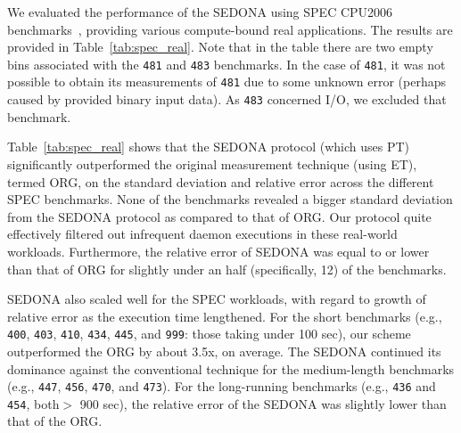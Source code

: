 \documentclass[letter]{ieice}
\begin{document}
We evaluated the performance of the SEDONA using SPEC CPU2006 
benchmarks~\cite{specCpu2006}, providing various compute-bound real applications. 
The results are provided in Table~\ref{tab:spec_real}.
Note that in the table there are two empty bins associated with 
the {\tt 481} and {\tt 483} benchmarks. 
In the case of {\tt 481}, it was not possible to obtain its 
measurements of {\tt 481} due to some unknown error 
(perhaps caused by provided binary input data). 
As {\tt 483} concerned I/O, we excluded that benchmark. 

Table~\ref{tab:spec_real} shows that
the SEDONA protocol (which uses PT) significantly outperformed the original 
measurement technique (using ET), termed ORG, 
on the standard deviation and relative error across the different SPEC benchmarks. 
None of the benchmarks revealed a bigger standard deviation from the SEDONA
protocol as compared to that of ORG.
Our protocol quite effectively filtered out infrequent daemon executions 
in these real-world workloads. 
Furthermore, the relative error of SEDONA was equal to or 
lower than that of ORG for slightly under an half (specifically, 12) of the benchmarks.

SEDONA also scaled well for the SPEC workloads, 
with regard to growth of relative error as the execution time lengthened.
For the short benchmarks 
(e.g., {\tt 400}, {\tt 403}, {\tt 410}, 
{\tt 434}, {\tt 445}, and {\tt 999}: those taking under 100 sec), 
our scheme outperformed the ORG by about 3.5x, on average. 
The SEDONA continued its dominance against the conventional technique 
for the medium-length benchmarks (e.g., {\tt 447}, {\tt 456}, {\tt 470}, and {\tt 473}).
For the long-running benchmarks (e.g., {\tt 436} and {\tt 454}, both$>$ 900 sec), 
the relative error of the \hbox{SEDONA} was slightly lower than that of the ORG.

\end{document}

